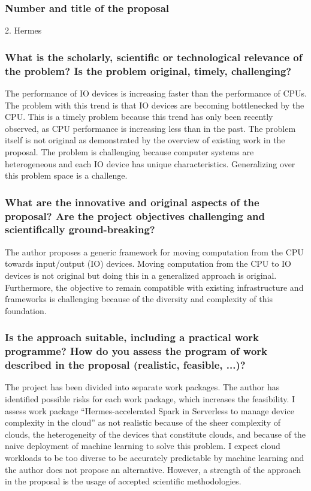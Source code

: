 \subsubsection*{Number and title of the proposal}
2. Hermes

\subsubsection*{What is the scholarly, scientific or technological relevance of the problem? Is the problem original, timely, challenging?}
The performance of IO devices is increasing faster than the performance of CPUs. The problem with this trend is that IO devices are becoming bottlenecked by the CPU. This is a timely problem because this trend has only been recently observed, as CPU performance is increasing less than in the past. The problem itself is not original as demonstrated by the overview of existing work in the proposal. The problem is challenging because computer systems are heterogeneous and each IO device has unique characteristics. Generalizing over this problem space is a challenge.

\subsubsection*{What are the innovative and original aspects of the proposal? Are the project objectives challenging and scientifically ground-breaking?}
The author proposes a generic framework for moving computation from the CPU towards input/output (IO) devices. Moving computation from the CPU to IO devices is not original but doing this in a generalized approach is original. Furthermore, the objective to remain compatible with existing infrastructure and frameworks is challenging because of the diversity and complexity of this foundation.

\subsubsection*{Is the approach suitable, including a practical work programme? How do you assess the program of work described in the proposal (realistic, feasible, ...)?}
The project has been divided into separate work packages. The author has identified possible risks for each work package, which increases the feasibility. I assess work package ``Hermes-accelerated Spark in Serverless to manage device complexity in the cloud'' as not realistic because of the sheer complexity of clouds, the heterogeneity of the devices that constitute clouds, and because of the naive deployment of machine learning to solve this problem. I expect cloud workloads to be too diverse to be accurately predictable by machine learning and the author does not propose an alternative. However, a strength of the approach in the proposal is the usage of accepted scientific methodologies.

